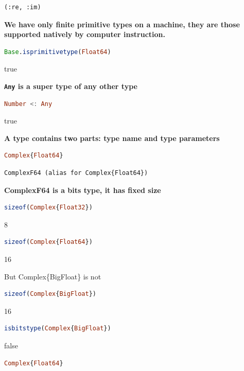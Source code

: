 \documentclass[
  notoc %
]{tufte-book}
\newcommand{\passthrough}[1]{#1}
\begin{document}
\begin{lstlisting}[language=Output]
(:re, :im)
\end{lstlisting}

\textbf{We have only finite primitive types on a machine, they are those
supported natively by computer instruction.}

\begin{lstlisting}[language=Julia]
Base.isprimitivetype(Float64)
\end{lstlisting}

true

\textbf{\passthrough{\lstinline!Any!} is a super type of any other type}

\begin{lstlisting}[language=Julia]
Number <: Any
\end{lstlisting}

true

\textbf{A type contains two parts: type name and type parameters}

\begin{lstlisting}[language=Julia]
Complex{Float64}
\end{lstlisting}

\begin{lstlisting}[language=Output]
ComplexF64 (alias for Complex{Float64})
\end{lstlisting}

\textbf{ComplexF64 is a bits type, it has fixed size}

\begin{lstlisting}[language=Julia]
sizeof(Complex{Float32})
\end{lstlisting}

8

\begin{lstlisting}[language=Julia]
sizeof(Complex{Float64})
\end{lstlisting}

16

But Complex\{BigFloat\} is not

\begin{lstlisting}[language=Julia]
sizeof(Complex{BigFloat})
\end{lstlisting}

16

\begin{lstlisting}[language=Julia]
isbitstype(Complex{BigFloat})
\end{lstlisting}

false

\begin{lstlisting}[language=Julia]
Complex{Float64}
\end{lstlisting}
\end{document}
